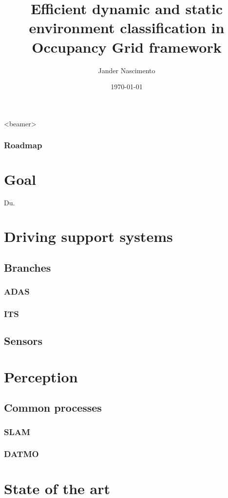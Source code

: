 \documentclass{beamer}
\title[Fast classification]{Efficient dynamic and static environment classification in Occupancy Grid framework}
\author{Jander Nascimento}
\institute{Université Joseph Fourier / INRIA}
\date{\today}
\begin{document}
\begin{frame}
\titlepage
\end{frame}

{
  \begin{frame}<beamer>
    \frametitle{Roadmap}
    \tableofcontents%
  \end{frame}
}

\section{Goal}

 	Du.

\section{Driving support systems}
\subsection{Branches}
\subsubsection{ADAS}
\subsubsection{ITS}
\subsection{Sensors}

\section{Perception}
\subsection{Common processes}
\subsubsection{SLAM}
\subsubsection{DATMO}

\section{State of the art}
\end{document}
